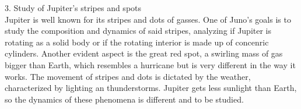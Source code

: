 3. Study of Jupiter's stripes and spots\\
Jupiter is well known for its stripes and dots of gasses. One of Juno's goals is to study the composition and dynamics of said stripes, analyzing if Jupiter is rotating as a solid body or if the rotating interior is made up of concenric cylinders. Another evident aspect is the great red spot, a swirling mass of gas bigger than Earth, which resembles a hurricane but is very different in the way it works. The movement of stripes and dots is dictated by the weather, characterized by lighting an thunderstorms. Jupiter gets less sunlight than Earth, so the dynamics of these phenomena is different and to be studied. 






